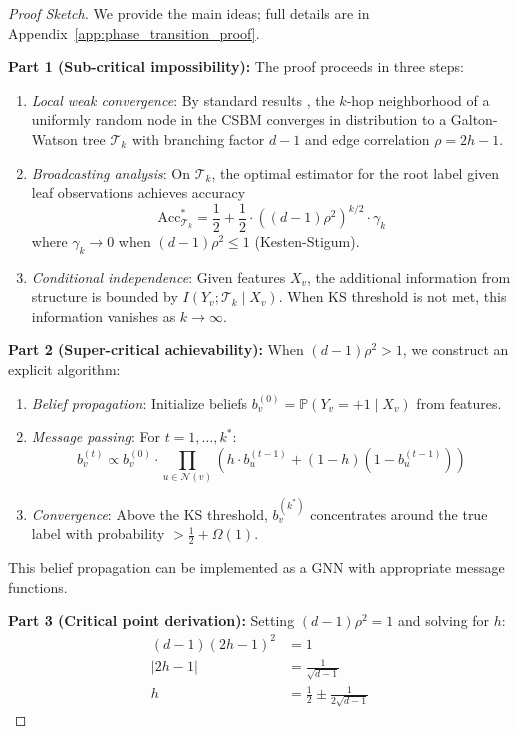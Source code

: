 \begin{proof}[Proof Sketch]
We provide the main ideas; full details are in Appendix~\ref{app:phase_transition_proof}.

\textbf{Part 1 (Sub-critical impossibility):}
The proof proceeds in three steps:
\begin{enumerate}
    \item \textit{Local weak convergence}: By standard results \cite{bordenave2015nonbacktracking}, the $k$-hop neighborhood of a uniformly random node in the CSBM converges in distribution to a Galton-Watson tree $\mathcal{T}_k$ with branching factor $d-1$ and edge correlation $\rho = 2h-1$.

    \item \textit{Broadcasting analysis}: On $\mathcal{T}_k$, the optimal estimator for the root label given leaf observations achieves accuracy
    \begin{equation}
        \mathrm{Acc}_{\mathcal{T}_k}^* = \frac{1}{2} + \frac{1}{2} \cdot ((d-1)\rho^2)^{k/2} \cdot \gamma_k
    \end{equation}
    where $\gamma_k \to 0$ when $(d-1)\rho^2 \leq 1$ (Kesten-Stigum).

    \item \textit{Conditional independence}: Given features $X_v$, the additional information from structure is bounded by $I(Y_v; \mathcal{T}_k \mid X_v)$. When KS threshold is not met, this information vanishes as $k \to \infty$.
\end{enumerate}

\textbf{Part 2 (Super-critical achievability):}
When $(d-1)\rho^2 > 1$, we construct an explicit algorithm:
\begin{enumerate}
    \item \textit{Belief propagation}: Initialize beliefs $b_v^{(0)} = \mathbb{P}(Y_v = +1 \mid X_v)$ from features.

    \item \textit{Message passing}: For $t = 1, \ldots, k^*$:
    \begin{equation}
        b_v^{(t)} \propto b_v^{(0)} \cdot \prod_{u \in \mathcal{N}(v)} \left( h \cdot b_u^{(t-1)} + (1-h)(1 - b_u^{(t-1)}) \right)
    \end{equation}

    \item \textit{Convergence}: Above the KS threshold, $b_v^{(k^*)}$ concentrates around the true label with probability $> \frac{1}{2} + \Omega(1)$.
\end{enumerate}
This belief propagation can be implemented as a GNN with appropriate message functions.

\textbf{Part 3 (Critical point derivation):}
Setting $(d-1)\rho^2 = 1$ and solving for $h$:
\begin{align}
    (d-1)(2h-1)^2 &= 1 \\
    |2h-1| &= \frac{1}{\sqrt{d-1}} \\
    h &= \frac{1}{2} \pm \frac{1}{2\sqrt{d-1}}
\end{align}
\end{proof}

